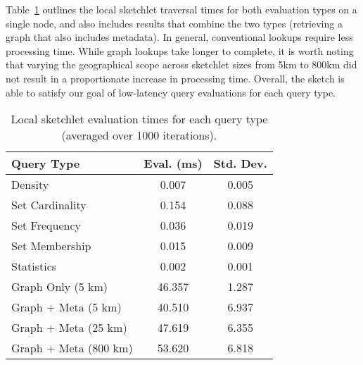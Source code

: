 Table~\ref{tbl:query-times} outlines the local sketchlet traversal times for both evaluation types on a single node, and also includes results that combine the two types (retrieving a graph that also includes metadata). In general, conventional lookups require less processing time. While graph lookups take longer to complete, it is worth noting that varying the geographical scope across sketchlet sizes from 5km to 800km did not result in a proportionate increase in processing time. Overall, the sketch is able to satisfy our goal of low-latency query evaluations for each query type.

\begin{table}[h!]
    \renewcommand{\arraystretch}{1.4}
    \caption{Local sketchlet evaluation times for each query type (averaged over 1000 iterations). \vspace{-1em}}
    \label{tbl:query-times}
    \begin{center}
        \begin{tabular}{|l|c|c|}
            \hline
            \textbf{Query Type}      & \textbf{Eval. (ms)} & \textbf{Std. Dev.} \\
            \hline
            Density                  & 0.007                    & 0.005 \\
            \hline
            Set Cardinality          & 0.154                    & 0.088 \\
            \hline
            Set Frequency            & 0.036                    & 0.019 \\
            \hline
            Set Membership           & 0.015                    & 0.009 \\
            \hline
            Statistics               & 0.002                    & 0.001 \\
            \hline
            \hline
            Graph Only (5 km)        & 46.357                   & 1.287 \\
            \hline
            Graph + Meta (5 km)      & 40.510                   & 6.937 \\
            \hline
            Graph + Meta (25 km)     & 47.619                   & 6.355 \\
            \hline
            Graph + Meta (800 km)    & 53.620                   & 6.818 \\
            \hline
        \end{tabular}
    \end{center}
\end{table}
